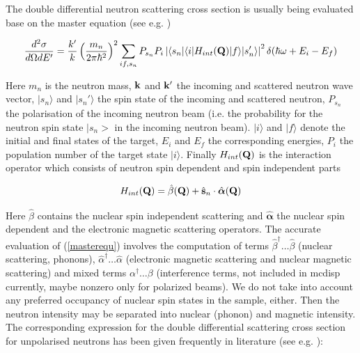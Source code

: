 The double differential neutron scattering cross section is usually being evaluated base on the master equation (see e.g. \cite{lovesey84-1})

\begin{equation}\label{masterequ}
\frac{d^2\sigma}{d\Omega dE'}=\frac{k'}{k}\left( \frac{m_n}{2\pi \hbar^2}  \right)^2
\sum_{if,s_n} P_{s_n} P_i \left | \langle s_n|\langle i|H_{int}(\mathbf Q)|f\rangle|s_n'\rangle \right |^2 \delta(\hbar \omega+E_i-E_f)
\end{equation}

Here $m_n$ is the neutron mass, $\mathbf k$ and $\mathbf k'$ the incoming and scattered neutron wave vector, $|s_n\rangle$ and 
 $|s_n'\rangle$ the spin state of the incoming and scattered neutron, $P_{s_n}$ the polarisation of the incoming neutron
beam (i.e. the probability for the neutron spin state $|s_n>$ in the incoming neutron beam). $|i\rangle$ and $|f\rangle$ denote
the initial and final states of the target, $E_i$ and $E_f$ the corresponding energies, $P_i$ the population number
of the target state $|i\rangle$. Finally $H_{int}(\mathbf Q)$ is the interaction operator which consists of neutron spin dependent
and spin independent parts

\begin{equation}
H_{int}(\mathbf Q)=\hat \beta (\mathbf Q) + \hat {\mathbf s}_n \cdot \hat {\boldsymbol \alpha} (\mathbf Q)
\end{equation}

Here $\hat \beta$ contains the nuclear spin independent scattering and $\hat {\bm \alpha}$ the nuclear spin dependent
and the electronic magnetic scattering operators.
The accurate evaluation of (\ref{masterequ}) involves the computation of terms $\hat \beta^{\dagger} \dots \hat \beta$ (nuclear scattering, phonons),
$\hat \alpha^{\dagger} \dots \hat \alpha$ (electronic magnetic scattering and nuclear magnetic scattering) 
and mixed terms $\alpha^{\dagger} \dots \beta$ (interference terms, not included in mcdisp currently, maybe nonzero only for
polarized beams).  We do not take into account any preferred occupancy of nuclear spin states in the sample, either.
Then the neutron intensity may be separated into nuclear (phonon) and magnetic intensity.
The corresponding expression for the double differential scattering cross section 
for unpolarised neutrons has been given frequently in literature (see e.g. \cite{lovesey84-1}):


